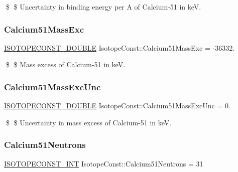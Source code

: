 \$ \$ Uncertainty in binding energy per A of Calcium-\/51 in keV. \mbox{\label{group___isotope_const-_calcium-_ca51_gab2ba1e5603e8c2fd06f58414e5210765}} 
\subsubsection{\texorpdfstring{Calcium51\+Mass\+Exc}{Calcium51MassExc}}
{\footnotesize\ttfamily \mbox{\hyperlink{group___isotope_const-_macros_ga8f45a7272ce02c0b4c65c44636ed719a}{I\+S\+O\+T\+O\+P\+E\+C\+O\+N\+S\+T\+\_\+\+D\+O\+U\+B\+LE}} Isotope\+Const\+::\+Calcium51\+Mass\+Exc = -\/36332.}

\$ \$ Mass excess of Calcium-\/51 in keV. \mbox{\label{group___isotope_const-_calcium-_ca51_gac78973eef37c56e661ec92b6a499260d}} 
\subsubsection{\texorpdfstring{Calcium51\+Mass\+Exc\+Unc}{Calcium51MassExcUnc}}
{\footnotesize\ttfamily \mbox{\hyperlink{group___isotope_const-_macros_ga8f45a7272ce02c0b4c65c44636ed719a}{I\+S\+O\+T\+O\+P\+E\+C\+O\+N\+S\+T\+\_\+\+D\+O\+U\+B\+LE}} Isotope\+Const\+::\+Calcium51\+Mass\+Exc\+Unc = 0.}

\$ \$ Uncertainty in mass excess of Calcium-\/51 in keV. \mbox{\label{group___isotope_const-_calcium-_ca51_gabeaa3ad8231b43ea455052977314cfff}} 
\subsubsection{\texorpdfstring{Calcium51\+Neutrons}{Calcium51Neutrons}}
{\footnotesize\ttfamily \mbox{\hyperlink{group___isotope_const-_macros_ga5f18360b3e99483a35c32d789e62621c}{I\+S\+O\+T\+O\+P\+E\+C\+O\+N\+S\+T\+\_\+\+I\+NT}} Isotope\+Const\+::\+Calcium51\+Neutrons = 31}

